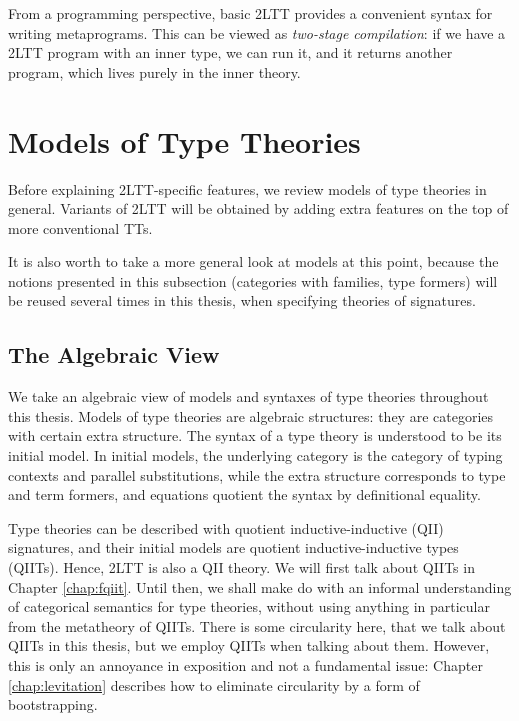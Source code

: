 \documentclass[12pt,a4paper,twoside,openany]{book}
\theoremstyle{remark}
\theoremstyle{definition}
\theoremstyle{theorem}
\begin{document}
From a programming perspective, basic 2LTT provides a convenient syntax for
writing metaprograms. This can be viewed as \emph{two-stage compilation}: if we
have a 2LTT program with an inner type, we can run it, and it returns another
program, which lives purely in the inner theory.

\section{Models of Type Theories}
\label{sec:models-of-tts}

Before explaining 2LTT-specific features, we review models of type theories
in general. Variants of 2LTT will be obtained by adding extra features on the
top of more conventional TTs.

It is also worth to take a more general look at models at this point, because
the notions presented in this subsection (categories with families, type
formers) will be reused several times in this thesis, when specifying theories
of signatures.

\subsection{The Algebraic View}

We take an algebraic view \cite{TODO} of models and syntaxes of type theories throughout
this thesis. Models of type theories are algebraic structures: they are
categories with certain extra structure. The syntax of a type theory is
understood to be its initial model. In initial models, the underlying category
is the category of typing contexts and parallel substitutions, while the extra
structure corresponds to type and term formers, and equations quotient the
syntax by definitional equality.

Type theories can be described with quotient inductive-inductive (QII)
signatures, and their initial models are quotient inductive-inductive types
(QIITs). Hence, 2LTT is also a QII theory. We will first talk about QIITs in
Chapter \ref{chap:fqiit}. Until then, we shall make do with an informal
understanding of categorical semantics for type theories, without using anything
in particular from the metatheory of QIITs. There is some circularity here, that
we talk about QIITs in this thesis, but we employ QIITs when talking about
them. However, this is only an annoyance in exposition and not a fundamental
issue: Chapter \ref{chap:levitation} describes how to eliminate circularity by a
form of bootstrapping.
\end{document}
